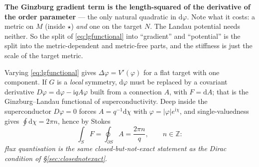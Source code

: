 \documentclass[10pt,a4paper]{article}
\newcommand{\dd}{\mathrm{d}}
\newcommand{\Z}{\mathbb{Z}}
\theoremstyle{plain}
\theoremstyle{definition}
\numberwithin{equation}{section}
\begin{document}
\begin{keybox}
\textbf{The Ginzburg gradient term is the length-squared of the derivative of the order
parameter} --- the only natural quadratic in $\dd\varphi$. Note what it costs: a metric on $M$
(inside $\star$) \emph{and} one on the target $N$. The Landau potential needs neither. So the
split of \eqref{eq:lgfunctional} into ``gradient'' and ``potential'' is the split into the
metric-dependent and metric-free parts, and the stiffness is just the scale of the target
metric.
\end{keybox}

\noindent Varying \eqref{eq:lgfunctional} gives $\Delta\varphi=V'(\varphi)$ for a flat target
with one component. If $G$ is a \emph{local} symmetry, $\dd\varphi$ must be replaced by a
covariant derivative $D\varphi=\dd\varphi-\mathrm{i}qA\varphi$ built from a connection $A$, with
$F=\dd A$; that is the Ginzburg--Landau functional of superconductivity. Deep inside the
superconductor $D\varphi=0$ forces $A=q^{-1}\dd\chi$ with $\varphi=|\varphi|e^{\mathrm i\chi}$,
and single-valuedness gives $\oint\dd\chi=2\pi n$, hence by Stokes
\begin{equation}
\int_SF=\oint_{\partial S}A=\frac{2\pi n}{q},\qquad n\in\Z:
\label{eq:fluxquant}
\end{equation}
\emph{flux quantisation is the same closed-but-not-exact statement as the Dirac condition of
\S\ref{sec:closednotexact}}.
\end{document}
